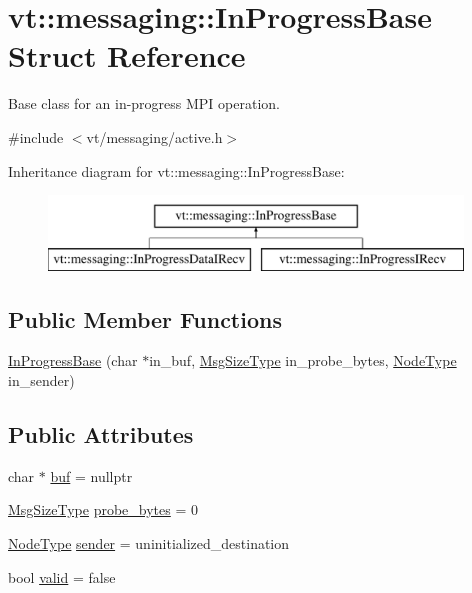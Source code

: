 \hypertarget{structvt_1_1messaging_1_1_in_progress_base}{}\section{vt\+:\+:messaging\+:\+:In\+Progress\+Base Struct Reference}
\label{structvt_1_1messaging_1_1_in_progress_base}


Base class for an in-\/progress M\+PI operation.  




{\ttfamily \#include $<$vt/messaging/active.\+h$>$}

Inheritance diagram for vt\+:\+:messaging\+:\+:In\+Progress\+Base\+:\begin{figure}[H]
\begin{center}
\leavevmode
\includegraphics[height=2.000000cm]{structvt_1_1messaging_1_1_in_progress_base}
\end{center}
\end{figure}
\subsection*{Public Member Functions}
\begin{DoxyCompactItemize}
\item 
\hyperlink{structvt_1_1messaging_1_1_in_progress_base_a76a5651bf56a3ed12ea800aa5b16cf22}{In\+Progress\+Base} (char $\ast$in\+\_\+buf, \hyperlink{namespacevt_a408e86a8c7c89309b52907dc5a513924}{Msg\+Size\+Type} in\+\_\+probe\+\_\+bytes, \hyperlink{namespacevt_a866da9d0efc19c0a1ce79e9e492f47e2}{Node\+Type} in\+\_\+sender)
\end{DoxyCompactItemize}
\subsection*{Public Attributes}
\begin{DoxyCompactItemize}
\item 
char $\ast$ \hyperlink{structvt_1_1messaging_1_1_in_progress_base_a0ca5ccc2c8a35f0094893d6da21af4fd}{buf} = nullptr
\item 
\hyperlink{namespacevt_a408e86a8c7c89309b52907dc5a513924}{Msg\+Size\+Type} \hyperlink{structvt_1_1messaging_1_1_in_progress_base_a702edc025a2cd95e5a267d5acbda9f1d}{probe\+\_\+bytes} = 0
\item 
\hyperlink{namespacevt_a866da9d0efc19c0a1ce79e9e492f47e2}{Node\+Type} \hyperlink{structvt_1_1messaging_1_1_in_progress_base_ad0c153e52ba71c9295a45d73a5d3ccd8}{sender} = uninitialized\+\_\+destination
\item 
bool \hyperlink{structvt_1_1messaging_1_1_in_progress_base_a5dce1ae0bdfaa40935023561e0d16671}{valid} = false
\end{DoxyCompactItemize}


